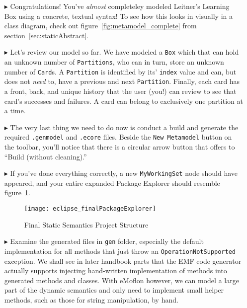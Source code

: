 \begin{itemize}
\item[$\blacktriangleright$] Congratulations! You've \emph{almost} completeley modeled Leitner's Learning Box using a concrete, textual syntax! To see how this looks in visually in a class diagram, check out figure~\ref{fig:metamodel_complete} from section~\ref{sec:staticAbstract}.

\item[$\blacktriangleright$] Let's review our model so far. We have modeled a \texttt{Box} which that can hold an unknown number of \texttt{Partitions}, who can in turn, store an unknown number of \texttt{Card}s. A \texttt{Partition} is identified by its' \texttt{index} value and can, but does not \emph{need} to, have a previous and next \texttt{Partition}. Finally, each card has a front, back, and unique history that the user (you!) can review to see that card's successes and failures. A card can belong to exclusively one partition at a time.

\item[$\blacktriangleright$]The very last thing we need to do now is conduct a build and generate the required \texttt{.genmodel} and \texttt{.ecore} files. Beside the \texttt{New Metamodel} button on the toolbar, you'll notice that there is a circular arrow button that offers to ``Build (without cleaning).'' %

\item[$\blacktriangleright$] If you've done everything correctly, a new \texttt{MyWorkingSet} node should have appeared, and your entire expanded Package Explorer should resemble figure~\ref{fig:builtModel}.

\begin{figure}[htbp]
	\centering
  \texttt{[image: eclipse\_finalPackageExplorer]}
	\caption{Final Static Semantics Project Structure}
	\label{fig:builtModel}
\end{figure}

\item[$\blacktriangleright$] Examine the generated files in \texttt{gen} folder, especially the default implementation for all methods that just throw an \texttt{OperationNotSupported} exception. We shall see in later handbook parts that the EMF code generator actually supports injecting hand-written implementation of methods into generated methods and classes. With eMoflon however, we can model a large part of the dynamic semantics and only need to implement small helper methods, such as those for string manipulation, by hand.


\end{itemize}
